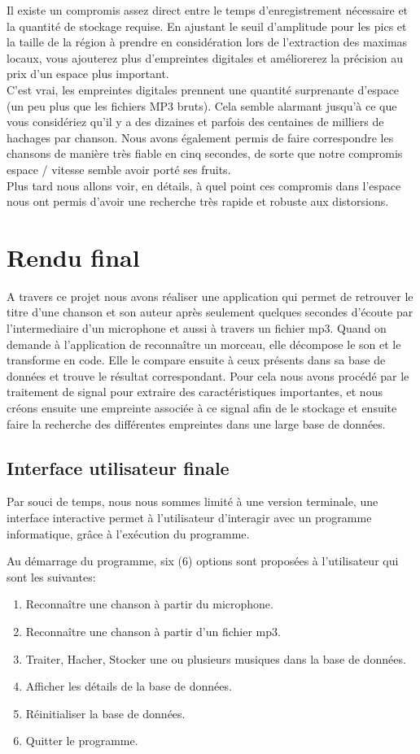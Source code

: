 \documentclass[11pt, report, french]{scrreprt}
\begin{document}
Il existe un compromis assez direct entre le temps d'enregistrement nécessaire et la quantité de stockage requise. En ajustant le seuil d'amplitude pour les pics et la taille de la région à prendre en considération lors de l'extraction des maximas locaux, vous ajouterez plus d'empreintes digitales et améliorerez la précision au prix d'un espace plus important.\\

C'est vrai, les empreintes digitales prennent une quantité surprenante d'espace (un peu plus que les fichiers MP3 bruts). Cela semble alarmant jusqu'à ce que vous considériez qu'il y a des dizaines et parfois des centaines de milliers de hachages par chanson. Nous avons également permis de faire correspondre les chansons de manière très fiable en cinq secondes, de sorte que notre compromis espace / vitesse semble avoir porté ses fruits.\\

Plus tard nous allons voir, en détails, à quel point ces compromis dans l'espace nous ont permis d'avoir une recherche très rapide et robuste aux distorsions.

\chapter{Rendu final}
\label{rf}
A travers ce projet nous avons réaliser une application qui permet de retrouver le titre d’une chanson et son auteur après seulement quelques secondes d’écoute par l'intermediaire d'un microphone et aussi à travers un fichier mp3.
Quand on demande à l’application de reconnaître un morceau, elle décompose le son et le transforme en code. Elle le compare ensuite à ceux présents dans sa base de données et trouve le résultat correspondant.
Pour cela nous avons procédé par le traitement de signal pour extraire des caractéristiques importantes, et nous créons ensuite une empreinte associée à ce signal afin de le stockage et ensuite faire la recherche des différentes empreintes dans une large base de données.
\section{Interface utilisateur finale}
Par souci de temps, nous nous sommes limité à une version terminale, une interface interactive permet à l'utilisateur d'interagir avec un programme informatique, grâce à l'exécution du programme.\\\par
Au démarrage du programme, six (6) options sont proposées à l'utilisateur qui sont les suivantes:
\begin{enumerate}
	\item Reconnaître une chanson à partir du microphone.
	\item Reconnaître une chanson à partir d’un fichier mp3.
	\item Traiter, Hacher, Stocker une ou plusieurs musiques dans la base de données.
	\item Afficher les détails de la base de données.
	\item Réinitialiser la base de données.
	\item Quitter le programme.
\end{enumerate}
\end{document}
